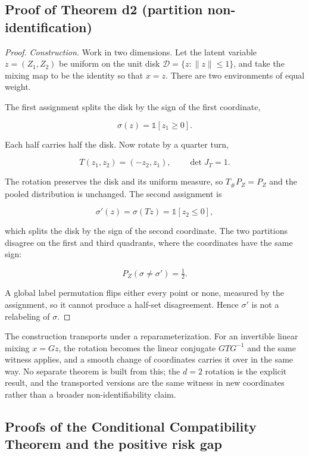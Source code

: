 \subsection{Proof of Theorem d2 (partition
non-identification)}\label{proof-of-theorem-d2-partition-non-identification}

\begin{proof}
\emph{Construction.} Work in two dimensions. Let the latent variable $z=(Z_1,Z_2)$ be uniform on the unit disk $\mathcal D=\{z:\|z\|\le 1\}$, and take the mixing map to be the identity so that $x=z$. There are two environments of equal weight.

The first assignment splits the disk by the sign of the first coordinate,

$$\sigma(z)=\mathbb 1[z_1\ge 0].$$

Each half carries half the disk. Now rotate by a quarter turn,

$$T(z_1,z_2)=(-z_2,z_1),\qquad \det J_T=1.$$

The rotation preserves the disk and its uniform measure, so $T_\#P_Z=P_Z$ and the pooled distribution is unchanged. The second assignment is

$$\sigma'(z)=\sigma(Tz)=\mathbb 1[z_2\le 0],$$

which splits the disk by the sign of the second coordinate. The two partitions disagree on the first and third quadrants, where the coordinates have the same sign:

\begin{equation}\label{eq:disagreement}
P_Z(\sigma\ne\sigma')=\tfrac12.
\end{equation}

A global label permutation flips either every point or none, measured by the assignment, so it cannot produce a half-set disagreement. Hence $\sigma'$ is not a relabeling of $\sigma$.
\end{proof}

The construction transports under a reparameterization. For an
invertible linear mixing \(x=Gz\), the rotation becomes the linear
conjugate \(GTG^{-1}\) and the same witness applies, and a smooth change
of coordinates carries it over in the same way. No separate theorem is
built from this; the \(d=2\) rotation is the explicit result, and the
transported versions are the same witness in new coordinates rather than
a broader non-identifiability claim.

\subsection{Proofs of the Conditional Compatibility Theorem and the
positive risk
gap}\label{proofs-of-the-conditional-compatibility-theorem-and-the-positive-risk-gap}

